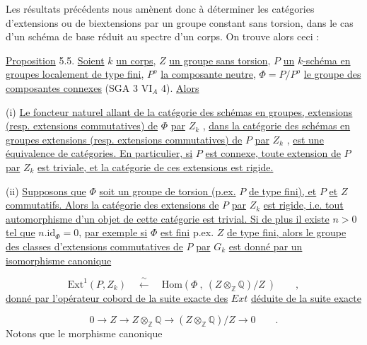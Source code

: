 Les résultats précédents nous amènent donc à déterminer les catégories d'extensions ou de biextensions par un groupe constant sans torsion, dans le cas d'un schéma de base réduit au spectre d'un corps. On trouve alors ceci :



\underline{Proposition} 5.5. \underline{Soient} $k$ \underline{un corps}, $Z$ \underline{un groupe sans torsion}, $P$ \underline{un} $k$\underline{-schéma en groupes localement de type fini}, $P^{o}$ \underline{la composante neutre}, $\Phi = P/P^{o}$ \underline{le groupe des composantes connexes} (SGA 3 $\mathrm{VI}_{A}$ 4). \underline{Alors}

(i) \underline{Le foncteur naturel allant de la catégorie des schémas en groupes, extensions (resp. extensions commutatives) de} $\Phi$ \underline{par} $Z_{k}$ , \underline{dans la catégorie des schémas en groupes extensions (resp. extensions commutatives) de} $P$ \underline{par} $Z_{k}$ , \underline{est une équivalence de catégories. En particulier, si} $P$ \underline{est connexe, toute extension de} $P$ \underline{par} $Z_{k}$ \underline{est triviale, et la catégorie de ces extensions est rigide.}

(ii) \underline{Supposons que} $\Phi$ \underline{soit un groupe de torsion (p.ex.} $P$ \underline{de type fini), et} $P$ \underline{et} $Z$ \underline{commutatifs. Alors la catégorie des extensions de} $P$ \underline{par} $Z_{k}$ \underline{est rigide, i.e. tout automorphisme d'un objet de cette catégorie est trivial. Si de plus il existe} $n > 0$ \underline{tel que} $n.\mathrm{id}_{\Phi} = 0$, \underline{par exemple si} $\Phi$ \underline{est fini} p.ex. $Z$ \underline{de type fini, alors le groupe des classes d'extensions commutatives de} $P$ \underline{par} $G_{k}$ \underline{est donné par un isomorphisme canonique}

\begin{equation}\tag{5.5.1}
\mathrm{Ext}^{1}(P,Z_{k}) \quad \xleftarrow{\;\sim\;} \quad \mathrm{Hom}(\Phi\ ,\ (Z\otimes_{\mathbb{Z}}\mathbb{Q})/Z\ ) \qquad ,
\end{equation}
\underline{donné par l'opérateur cobord de la suite exacte des} $Ext$ \underline{déduite de la suite exacte}

\begin{equation}\tag{5.5.2}
0 \longrightarrow Z \longrightarrow Z\otimes_{\mathbb{Z}}\mathbb{Q} \longrightarrow (Z\otimes_{\mathbb{Z}}\mathbb{Q})/Z \longrightarrow 0 \qquad .
\end{equation}
Notons que le morphisme canonique

